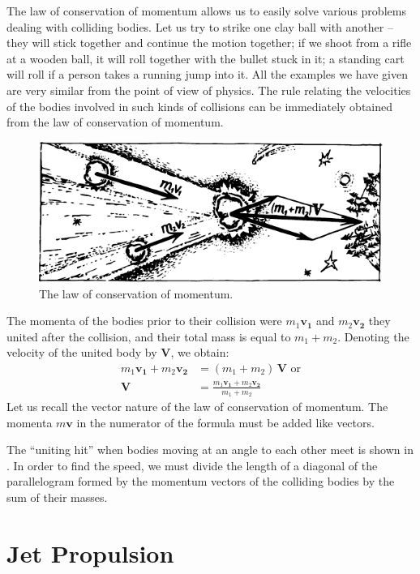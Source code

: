 The law of conservation of momentum allows us to
easily solve various problems dealing with colliding
bodies. Let us try to strike one clay ball with another -- they will stick together and continue the motion together;
if we shoot from a rifle at a wooden ball, it will roll together with the bullet stuck in it; a standing cart will roll
if a person takes a running jump into it. All the examples
we have given are very similar from the point of view of
physics. The rule relating the velocities of the bodies
involved in such kinds of collisions can be immediately
obtained from the law of conservation of momentum.
\begin{figure}[!ht]
\centering
\includegraphics[width=\textwidth]{figures/fig-03-02.pdf}
\caption{The law of conservation of momentum.}
\label{fig-3.02}
\end{figure}

The momenta of the bodies prior to their collision were
$m_{1}\mathbf{v_{1}}$ and $m_{2}\mathbf{v_{2}}$ they united after the collision, and their total mass is equal to $m_{1} + m_{2}$. Denoting the velocity of the united body by $\mathbf{V}$, we obtain:
\begin{align*}%
m_{1}\mathbf{v_{1}} + m_{2}\mathbf{v_{2}} & = (m_{1} + m_{2})\, \mathbf{V} \,\, \textrm{or}\\
\mathbf{V} & = \frac{m_{1}\mathbf{v_{1}} + m_{2}\mathbf{v_{2}}}{m_{1} + m_{2}}
\end{align*}
Let us recall the vector nature of the law of conservation
of momentum. The momenta $m\mathbf{v}$ in the numerator of the
formula must be added like vectors.

The ``uniting hit'' when bodies moving at an angle to
each other meet is shown in . In order to find
the speed, we must divide the length of a diagonal of the
parallelogram formed by the momentum vectors of the
colliding bodies by the sum of their masses.

\section{Jet Propulsion}

